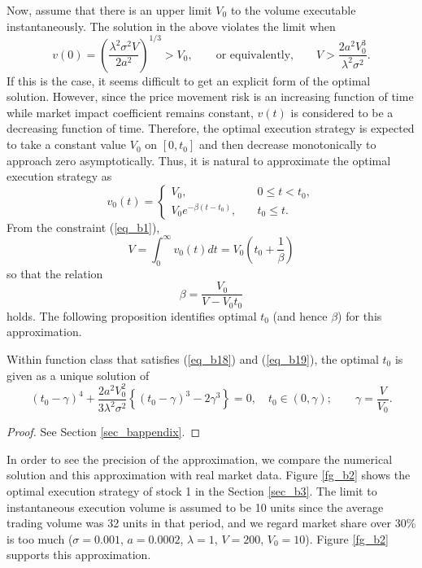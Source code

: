  Now, assume that there is an upper limit $V_0$ to the volume executable instantaneously.  The solution in the above violates the limit when
\begin{equation}\label{eq_b20}
  v(0)=\left( \frac{\lambda^2 \sigma^2 V}{2a^2} \right)^{1/3} > V_0, \qquad
  \mbox{or\ equivalently,} \qquad V>\frac{2a^2V_0^3}{\lambda^2\sigma^2}.
\end{equation}
 If this is the case, it seems difficult to get an explicit form of the optimal solution.  However, since the price movement risk is an increasing function of time while market impact coefficient remains constant, $v(t)$ is considered to be a decreasing function of time.  Therefore, the optimal execution strategy is expected to take a constant value $V_0$ on $[0,t_0]$ and then decrease monotonically to approach zero asymptotically.  Thus, it is natural to approximate the optimal execution strategy as
\begin{equation}\label{eq_b18}
  v_0(t) = \left\{
  \begin{array}{ll}
   V_0, & \quad 0 \leq t < t_0, \\
   V_0 e^{-\beta (t-t_0)}, & \quad t_0 \leq t.
  \end{array}
  \right.
\end{equation}
 From the constraint (\ref{eq_b1}),
\[
  V = \int_0^\infty v_0(t) dt = V_0 \left( t_0 + \frac{1}{\beta} \right)
\]
so that the relation
\begin{equation}\label{eq_b19}
  \beta = \frac{V_0}{V-V_0t_0}
\end{equation}
holds.
 The following proposition identifies optimal $t_0$ (and hence $\beta$) for this approximation.

\begin{proposition}\label{prop_b2}
 \quad Within function class that satisfies (\ref{eq_b18}) and (\ref{eq_b19}),
the optimal $t_0$ is given as a unique solution of
\begin{equation}\label{eq_b30}
  \left(t_0-\gamma\right)^4 + \frac{2a^2V_0^2}{3\lambda^2\sigma^2}
  \left\{ \left( t_0 - \gamma \right)^3-2 \gamma^3 \right\} = 0, \quad
  t_0 \in (0, \gamma);
  \qquad \gamma=\frac{V}{V_0}.
\end{equation}
\end{proposition}
\begin{proof}
  See Section \ref{sec_bappendix}.
\end{proof}

\noindent In order to see the precision of the approximation, we compare the numerical solution and this approximation with real market data.  Figure \ref{fg_b2} shows the optimal execution strategy of stock 1 in the Section \ref{sec_b3}.  The limit to instantaneous execution volume is assumed to be 10 units since the average trading volume was 32 units in that period, and we regard market share over 30\% is too much ($\sigma=0.001$, $a=0.0002$, $\lambda=1$, $V=200$, $V_0=10$).  Figure \ref{fg_b2} supports this approximation.

